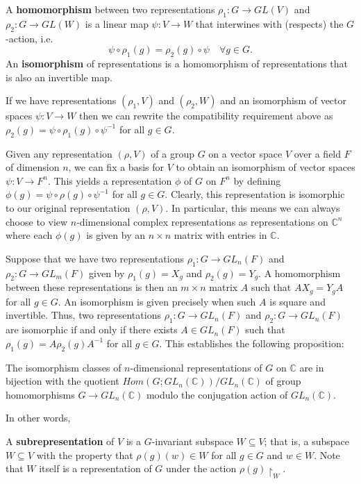 
\begin{defn}
A \textbf{homomorphism} between two representations $\rho_1 \colon G \to GL(V)$ and $\rho_2 \colon G \to GL(W)$ is a linear map $\psi \colon V \to W$ that interwines with (respects) the $G$-action, i.e. 
\[ \psi \circ \rho_1 (g)= \rho_2(g) \circ \psi \quad \forall  g \in G. \]  
An \textbf{isomorphism} of representations is a homomorphism of representations that is also an invertible map.
\end{defn}
\begin{note}
If we have representations $(\rho_1, V)$ and $(\rho_2, W)$ and an isomorphism of vector spaces $\psi \colon V \to W$ then we can rewrite the compatibility requirement above as $\rho_2(g) = \psi \circ \rho_1(g) \circ \psi^{-1}$ for all $g \in G$.
\end{note}

Given any representation $(\rho, V)$ of a group $G$ on a vector space $V$ over a field $F$ of dimension $n$, we can fix a basis for $V$ to obtain an isomorphism of vector spaces $\psi \colon V \to F^n$.  This yields a representation $\phi$ of $G$ on $F^n$ by defining $\phi (g) = \psi \circ \rho(g) \circ \psi^{-1}$ for all $g \in G$. Clearly, this representation is isomorphic to our original representation $(\rho, V)$. In particular, this means we can always choose to view $n$-dimensional complex representations as representations on $\mathbb{C}^n$ where each $\phi(g)$ is given by an $n \times n$ matrix with entries in $\mathbb{C}$.

Suppose that we have two representations $\rho_1 \colon G \to GL_n(F)$ and $\rho_2 \colon G \to GL_m(F)$ given by $\rho_1(g) = X_g$ and $\rho_2(g) = Y_g$.  A homomorphism between these representations is then an $m \times n$ matrix $A$ such that $A X_g = Y_g A$ for all $g \in G$.   An isomorphism is given precisely when such $A$ is square and invertible.  Thus, two representations $\rho_1 \colon G \to GL_n(F)$ and $\rho_2 \colon G \to GL_n(F)$ are isomorphic if and only if there exists $A \in GL_n(F)$ such that $\rho_1(g) = A \rho_2(g) A^{-1}$ for all $g \in G$.  This establishes the following proposition:
\begin{prop} \label{iso-classes-of-reprns}
The isomorphism classes of $n$-dimensional representations of $G$ on $\mathbb{C}$ are in bijection with the quotient $Hom(G; GL_n(\mathbb{C})) / GL_n(\mathbb{C})$ of group homomorphisms $G \to GL_n(\mathbb{C})$ modulo the conjugation action of $GL_n(\mathbb{C})$.
\end{prop}
\begin{note}
In other words, 
\end{note}
\begin{defn} A \textbf{subrepresentation} of $V$ is a $G$-invariant subspace $W \subseteq V$; that is, a subspace $W \subseteq V$ with the property that $\rho(g) (w) \in W$ for all $g \in G$ and $w \in W$.  Note that $W$ itself is a representation of $G$ under the action $\rho(g) \restriction_W$.
\end{defn}


